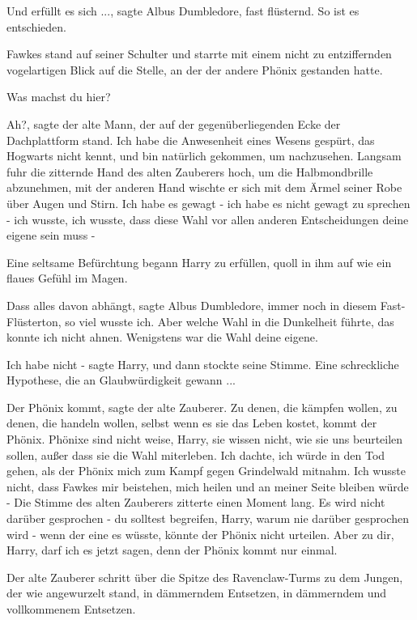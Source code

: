 \glqq{}Und erfüllt es sich ...\grqq{}, sagte Albus Dumbledore, fast flüsternd.
\glqq{}So ist es entschieden.\grqq{}

Fawkes stand auf seiner Schulter und starrte mit einem nicht zu entziffernden
vogelartigen Blick auf die Stelle, an der der andere Phönix gestanden hatte.

\glqq{}Was machst du hier?\grqq{}

\glqq{}Ah?\grqq{}, sagte der alte Mann, der auf der gegenüberliegenden Ecke der
Dachplattform stand. \glqq{}Ich habe die Anwesenheit eines Wesens gespürt, das
Hogwarts nicht kennt, und bin natürlich gekommen, um nachzusehen.\grqq{} Langsam
fuhr die zitternde Hand des alten Zauberers hoch, um die Halbmondbrille
abzunehmen, mit der anderen Hand wischte er sich mit dem Ärmel seiner Robe über
Augen und Stirn. \glqq{}Ich habe es gewagt - ich habe es nicht gewagt zu sprechen
- ich wusste, ich wusste, dass diese Wahl vor allen anderen Entscheidungen deine
eigene sein muss -\grqq{}

Eine seltsame Befürchtung begann Harry zu erfüllen, quoll in ihm auf wie ein
flaues Gefühl im Magen.

\glqq{}Dass alles davon abhängt\grqq{}, sagte Albus Dumbledore, immer noch in
diesem Fast-Flüsterton, \glqq{}so viel wusste ich. Aber welche Wahl in die
Dunkelheit führte, das konnte ich nicht ahnen. Wenigstens war die Wahl deine
eigene.\grqq{}

\glqq{}Ich habe nicht -\grqq{} sagte Harry, und dann stockte seine Stimme. Eine
schreckliche Hypothese, die an Glaubwürdigkeit gewann ...

\glqq{}Der Phönix kommt\grqq{}, sagte der alte Zauberer. \glqq{}Zu denen, die
kämpfen wollen, zu denen, die handeln wollen, selbst wenn es sie das Leben
kostet, kommt der Phönix. Phönixe sind nicht weise, Harry, sie wissen nicht, wie
sie uns beurteilen sollen, außer dass sie die Wahl miterleben. Ich dachte, ich
würde in den Tod gehen, als der Phönix mich zum Kampf gegen Grindelwald mitnahm.
Ich wusste nicht, dass Fawkes mir beistehen, mich heilen und an meiner Seite
bleiben würde -\grqq{} Die Stimme des alten Zauberers zitterte einen Moment
lang. \glqq{}Es wird nicht darüber gesprochen - du solltest begreifen, Harry,
warum nie darüber gesprochen wird - wenn der eine es wüsste, könnte der Phönix
nicht urteilen. Aber zu dir, Harry, darf ich es jetzt sagen, denn der Phönix
kommt nur einmal.\grqq{}

Der alte Zauberer schritt über die Spitze des Ravenclaw-Turms zu dem Jungen, der
wie angewurzelt stand, in dämmerndem Entsetzen, in dämmerndem und vollkommenem
Entsetzen.

